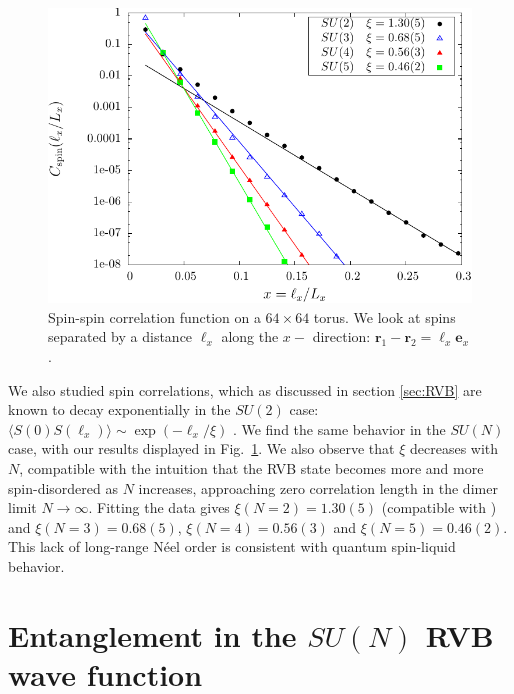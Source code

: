 \documentclass[11pt]{iopart}
\begin{document}
\begin{figure}[ht]
 \begin{center}
  \includegraphics[scale=0.8]{./figures/spin_corr.pdf}
 \end{center}
\caption{Spin-spin correlation function on a $64\times 64$ torus. We look at spins separated by a distance $\ell_x$ along the $x-$ direction:  $\mathbf{r}_1-\mathbf{r}_2=\ell_x \mathbf{e}_x$. }
\label{fig:corrspin_su2}
\end{figure}
We also studied spin correlations, which as discussed in section \ref{sec:RVB} are known to decay exponentially in the $SU(2)$ case: 
$
 \langle S(0)S(\ell_x) \rangle \sim \exp \left(-{\ell_x}/{\xi}\right)
$ \cite{LDA,RVB1}.
We find the same behavior in the $SU(N)$ case, with our results displayed in Fig.~\ref{fig:corrspin_su2}. We also observe that $\xi$ decreases with $N$, compatible with the intuition that the RVB state becomes more and more spin-disordered as $N$ increases, approaching zero correlation length in the dimer limit $N\to\infty$. Fitting the data gives  $\xi(N=2)=1.30(5)$ (compatible with \cite{RVB1}) and $\xi(N=3)=0.68(5)$, $\xi(N=4)=0.56(3)$ and $\xi(N=5)=0.46(2)$. This lack of long-range N\'eel order is consistent with quantum spin-liquid  behavior. 




\section{Entanglement in the $SU(N)$ RVB wave function}
\label{sec:rvb_entanglement}
\end{document}
